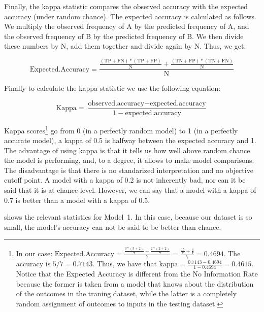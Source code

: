 Finally, the kappa statistic compares the observed accuracy with the expected accuracy (under random
chance). The expected accuracy is calculated as follows. We multiply the observed frequency of A by
the predicted frequency of A, and the observed frequency of B by the predicted frequency of B. We
then divide these numbers by N, add them together and divide again by N. Thus, we get:
%

\begin{equation}
    \textrm{Expected.Accuracy}=\frac{\frac{(\textrm{TP}+\textrm{FN})*(\textrm{TP}+\textrm{FP})}{\textrm{N}} + \frac{(\textrm{TN}+\textrm{FP})*(\textrm{TN}+\textrm{FN})}{\textrm{N}}}{\textrm{N}}
\end{equation}

Finally to calculate the kappa statistic we use the following equation:

\begin{equation}
  \textrm{Kappa} = \frac{\textrm{observed.accuracy} - \textrm{expected.accuracy}}{1 - \textrm{expected.accuracy}}
\end{equation}

Kappa scores\footnote{In our case: $\textrm{Expected.Accuracy}=\frac{\frac{3*(3+2)}{7} + \frac{2*(2+2)}{7}}{7} = \frac{\frac{15}{7}+\frac{4}{7}}{7} = 0.4694$. The accuracy is $5/7=0.7143$. Thus, we have that $\textrm{kappa} = \frac{0.7143 - 0.4694}{1 - 0.4694}=0.4615$. Notice that the Expected Accuracy is different from the No Information Rate because the former is taken from a model that knows about the distribution of the outcomes in the traning dataset, while the latter is a completely random assignment of outcomes to inputs in the testing dataset.} go from 0 (in a perfectly random model) to 1 (in a perfectly accurate model), a kappa of 0.5 is halfway between the expected accuracy and 1. The advantage of using kappa is that it tells us how well above random chance the model is performing, and, to a degree, it allows to make model comparisons. The disadvantage is that there is no standarized interpretation and no objective cutoff point. A model with a kappa of 0.2 is not inherently bad, nor can it be said that it is at chance level. However, we can say that a model with a kappa of 0.7 is better than a model with a kappa of 0.5.

 shows the relevant statistics for Model~1. In this case, because our dataset is so small, the model's accuracy can not be said to be better than chance.

